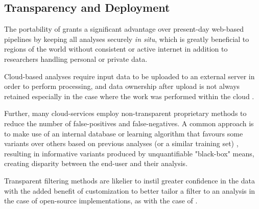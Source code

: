 \subsection{Transparency and Deployment}

The portability of \app grants a significant advantage over present-day web-based pipelines by keeping all analyses securely \textit{in situ}, which is greatly beneficial to regions of the world without consistent or active internet in addition to researchers handling personal or private data.

Cloud-based analyses require input data to be uploaded to an external server in order to perform processing, and data ownership after upload is not always retained especially in the case where the work was performed within the cloud \citep{reed2010information}.

Further, many cloud-services employ non-transparent proprietary methods to reduce the number of false-positives and false-negatives. A common approach is to make use of an internal database or learning algorithm that favours some variants over others based on previous analyses (or a similar training set) \citep{pabinger2014survey}, resulting in informative variants produced by unquantifiable "black-box" means, creating disparity between the end-user and their analysis.

Transparent filtering methods are likelier to instil greater confidence in the data with the added benefit of customization to better tailor a filter to an analysis in the case of open-source implementations, as with the case of \app.
